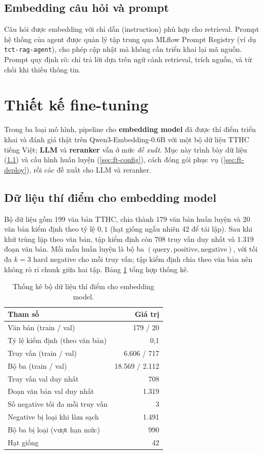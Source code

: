 \subsection{Embedding câu hỏi và prompt}

Câu hỏi được embedding với chỉ dẫn (instruction) phù hợp cho retrieval. Prompt hệ thống của
agent \rag{} được quản lý tập trung qua MLflow Prompt Registry (ví dụ \texttt{tct-rag-agent}),
cho phép cập nhật mà không cần triển khai lại mã nguồn. Prompt quy định rõ: chỉ trả lời dựa
trên ngữ cảnh retrieval, trích nguồn, và từ chối
khi thiếu thông tin.

\section{Thiết kế fine-tuning}
\label{sec:cai-dat-ft}

Trong ba loại mô hình, pipeline cho \textbf{embedding model} đã được thí điểm triển khai và
đánh giá thật trên Qwen3-Embedding-0.6B với một bộ dữ liệu TTHC tiếng Việt; \textbf{LLM} và
\textbf{reranker} vẫn ở mức \emph{đề xuất}. Mục này trình bày dữ liệu (\ref{sec:ft-data}) và
cấu hình huấn luyện (\ref{sec:ft-config}), cách đóng gói phục vụ (\ref{sec:ft-deploy}), rồi
các đề xuất cho LLM và reranker.

\subsection{Dữ liệu thí điểm cho embedding model}
\label{sec:ft-data}

Bộ dữ liệu gồm 199 văn bản TTHC, chia thành 179 văn bản huấn luyện và 20 văn bản kiểm định
theo tỷ lệ $0{,}1$ (hạt giống ngẫu nhiên 42 để tái lập). Sau khi khử trùng lặp theo văn bản,
tập kiểm định còn 708 truy vấn duy nhất và 1.319 đoạn văn bản. Mỗi mẫu huấn luyện là bộ ba
$(\text{query},\text{positive},\text{negative})$, với tối đa $k=3$ hard negative cho mỗi truy
vấn; tập kiểm định chia theo văn bản nên không rò rỉ chunk giữa hai tập. Bảng
\ref{tab:ft-dataset} tổng hợp thống kê.

\begin{table}[htbp]
\centering
\caption{Thống kê bộ dữ liệu thí điểm cho embedding model.}
\label{tab:ft-dataset}
\small
\begin{tabular}{@{}lr@{}}
\toprule
\textbf{Tham số} & \textbf{Giá trị} \\
\midrule
Văn bản (train / val) & 179 / 20 \\
Tỷ lệ kiểm định (theo văn bản) & 0{,}1 \\
Truy vấn (train / val) & 6.606 / 717 \\
Bộ ba (train / val) & 18.569 / 2.112 \\
Truy vấn val duy nhất & 708 \\
Đoạn văn bản val duy nhất & 1.319 \\
Số negative tối đa mỗi truy vấn & 3 \\
Negative bị loại khi làm sạch & 1.491 \\
Bộ ba bị loại (vượt hạn mức) & 990 \\
Hạt giống & 42 \\
\bottomrule
\end{tabular}
\end{table}

